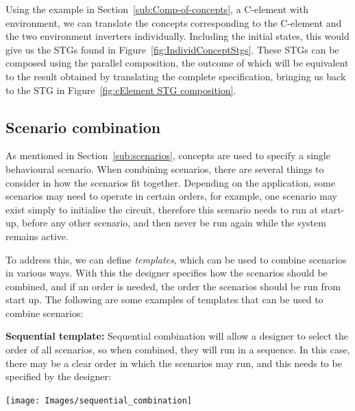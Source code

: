 \documentclass[british, journal]{IEEEtran}
\begin{document}
Using the example in Section~\ref{sub:Comp-of-concepts}, a C-element with environment,
we can translate the concepts corresponding to the C-element and the two
environment inverters individually. Including the initial states, this would
give us the STGs found in Figure~\ref{fig:IndividConceptStgs}. These STGs can be
composed using the parallel composition, the outcome of which will be equivalent
to the result obtained by translating the complete specification, bringing us back
to the STG in Figure~\ref{fig:cElement STG composition}.

\vspace{-1mm}
\subsection{Scenario combination\label{sub:scenario-composition}}

As mentioned in Section~\ref{sub:scenarios}, concepts are used to specify
a single behavioural scenario.
When combining scenarios, there are several things to consider in
how the scenarios fit together. Depending on the application,
some scenarios may need to operate in certain
orders, for example, one scenario may exist simply to initialise the
circuit, therefore this scenario needs to run at start-up, before
any other scenario, and then never be run again while the
system remains active.

To address this, we can define \emph{templates},
which can be used to combine scenarios in various ways.
With this the designer specifies how the scenarios should
be combined, and if an order is needed, the order the scenarios should
be run from start up. The following are some examples of templates
that can be used to combine scenarios:

\textbf{Sequential template:} Sequential combination will allow a designer
to select the order of all scenarios, so when combined, they will
run in a sequence. In this case, there may be a clear order in which
the scenarios may run, and this needs to be specified by the designer:

\begin{center}
\texttt{[image: Images/sequential\_combination]}
\end{center}
\end{document}
